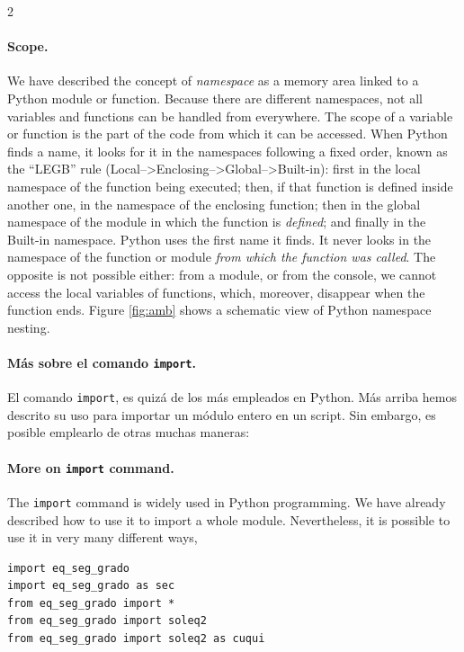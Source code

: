 \begin{paracol}{2}
\paragraph{Scope.}  We have described the concept of \emph{namespace} as a memory area linked to a Python module or function. Because there are different namespaces, not all variables and functions can be handled from everywhere. The scope of a variable or function is the part of the code from which it can be accessed. When Python finds a name, it looks for it in the namespaces following a fixed order, known as the ``LEGB'' rule (Local--\textgreater Enclosing--\textgreater Global--\textgreater Built-in): first in the local namespace of the function being executed; then, if that function is defined inside another one, in the namespace of the enclosing function; then in the global namespace of the module in which the function is \emph{defined}; and finally in the Built-in namespace. Python uses the first name it finds. It never looks in the namespace of the function or module \emph{from which the function was called}. The opposite is not possible either: from a module, or from the console, we cannot access the local variables of functions, which, moreover, disappear when the function ends.
Figure \ref{fig:amb} shows a schematic view of Python namespace nesting.
\switchcolumn
\paragraph{Más sobre el comando \texttt{import}.} El comando \texttt{import}, es quizá de los más empleados en Python. Más arriba hemos descrito su uso para importar un módulo entero en un script. Sin embargo, es posible emplearlo de otras muchas maneras:
\switchcolumn
\paragraph{More on \texttt{import} command.} The \texttt{import} command is widely used in Python programming. We have already described how to use it to import a whole module. Nevertheless, it is possible to use it in very many different ways,
\end{paracol}

\begin{verbatim}
import eq_seg_grado
import eq_seg_grado as sec
from eq_seg_grado import *
from eq_seg_grado import soleq2
from eq_seg_grado import soleq2 as cuqui
\end{verbatim}


